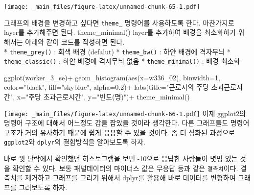\documentclass[
]{book}
\newenvironment{Shaded}{\begin{snugshade}}{\end{snugshade}}
\newcommand{\AttributeTok}[1]{\textcolor[rgb]{0.77,0.63,0.00}{#1}}
\newcommand{\DecValTok}[1]{\textcolor[rgb]{0.00,0.00,0.81}{#1}}
\newcommand{\FloatTok}[1]{\textcolor[rgb]{0.00,0.00,0.81}{#1}}
\newcommand{\FunctionTok}[1]{\textcolor[rgb]{0.00,0.00,0.00}{#1}}
\newcommand{\NormalTok}[1]{#1}
\newcommand{\SpecialCharTok}[1]{\textcolor[rgb]{0.00,0.00,0.00}{#1}}
\newcommand{\StringTok}[1]{\textcolor[rgb]{0.31,0.60,0.02}{#1}}
\theoremstyle{definition}
\theoremstyle{definition}
\theoremstyle{definition}
\theoremstyle{definition}
\theoremstyle{remark}
\begin{document}
\texttt{[image: \_main\_files/figure-latex/unnamed-chunk-65-1.pdf]}

그래프의 배경을 변경하고 싶다면 \texttt{theme\_} 명령어를 사용하도록 한다. 마찬가지로 layer를 추가해주면 된다. theme\_minimal() layer를 추가하여 배경을 최소화하기 위해서는 아래와 같이 코드를 작성하면 된다.\\
* \texttt{theme\_grey()} : 회색 배경 (defalut)
* \texttt{theme\_bw()} : 하얀 배경에 격자무늬
* \texttt{theme\_classic()} : 하얀 배경에 격자무늬 없음
* \texttt{theme\_minimal()} : 배경 최소화

\begin{Shaded}
\begin{Highlighting}[]
\FunctionTok{ggplot}\NormalTok{(worker\_3\_se)}\SpecialCharTok{+}
  \FunctionTok{geom\_histogram}\NormalTok{(}\FunctionTok{aes}\NormalTok{(}\AttributeTok{x=}\NormalTok{w336\_02), }\AttributeTok{binwidth=}\DecValTok{1}\NormalTok{, }\AttributeTok{color=}\StringTok{"black"}\NormalTok{, }\AttributeTok{fill=}\StringTok{"skyblue"}\NormalTok{, }\AttributeTok{alpha=}\FloatTok{0.2}\NormalTok{)}\SpecialCharTok{+}
  \FunctionTok{labs}\NormalTok{(}\AttributeTok{title=}\StringTok{"근로자의 주당 초과근로시간"}\NormalTok{, }\AttributeTok{x=}\StringTok{"주당 초과근로시간"}\NormalTok{, }\AttributeTok{y=}\StringTok{"빈도(명)"}\NormalTok{)}\SpecialCharTok{+}
  \FunctionTok{theme\_minimal}\NormalTok{()}
\end{Highlighting}
\end{Shaded}

\texttt{[image: \_main\_files/figure-latex/unnamed-chunk-66-1.pdf]}
이제 ggplot2의 명령어 구조에 대해서 어느정도 감을 잡았을 것이라 생각한다. 다른 그래프들도 명령어 구조가 거의 유사하기 때문에 쉽게 응용할 수 있을 것이다. 좀 더 심화된 과정으로 \texttt{ggplot2}와 \texttt{dplyr}의 결합방식을 알아보도록 하자.

바로 윗 단락에서 확인했던 히스토그램을 보면 -10으로 응답한 사람들이 몇명 있는 것을 확인할 수 있다. 보통 패널데이터의 마이너스 값은 무응답 등과 같은 \texttt{결측치}이다. 결측치를 제거하고 그래프를 그리기 위해서 dplyr를 활용해 바로 데이터를 변형하여 그래프를 그려보도록 하자.
\end{document}
